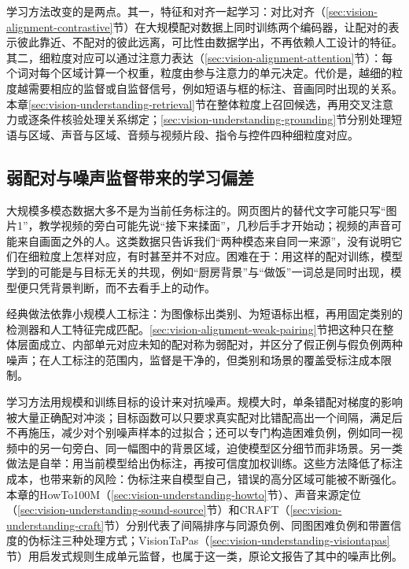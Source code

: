 学习方法改变的是两点。其一，特征和对齐一起学习：对比对齐（\ref{sec:vision-alignment-contrastive}节）在大规模配对数据上同时训练两个编码器，让配对的表示彼此靠近、不配对的彼此远离，可比性由数据学出，不再依赖人工设计的特征。其二，细粒度对应可以通过注意力表达（\ref{sec:vision-alignment-attention}节）：每个词对每个区域计算一个权重，粒度由参与注意力的单元决定。代价是，越细的粒度越需要相应的监督或自监督信号，例如短语与框的标注、音画同时出现的关系。本章\ref{sec:vision-understanding-retrieval}节在整体粒度上召回候选，再用交叉注意力或逐条件核验处理关系绑定；\ref{sec:vision-understanding-grounding}节分别处理短语与区域、声音与区域、音频与视频片段、指令与控件四种细粒度对应。

\subsection{弱配对与噪声监督带来的学习偏差}
\label{sec:vision-understanding-challenge-weak-pairing}

大规模多模态数据大多不是为当前任务标注的。网页图片的替代文字可能只写“图片1”，教学视频的旁白可能先说“接下来揉面”，几秒后手才开始动；视频的声音可能来自画面之外的人。这类数据只告诉我们“两种模态来自同一来源”，没有说明它们在细粒度上怎样对应，有时甚至并不对应。困难在于：用这样的配对训练，模型学到的可能是与目标无关的共现，例如“厨房背景”与“做饭”一词总是同时出现，模型便只凭背景判断，而不去看手上的动作。

经典做法依靠小规模人工标注：为图像标出类别、为短语标出框，再用固定类别的检测器和人工特征完成匹配。\ref{sec:vision-alignment-weak-pairing}节把这种只在整体层面成立、内部单元对应未知的配对称为弱配对，并区分了假正例与假负例两种噪声；在人工标注的范围内，监督是干净的，但类别和场景的覆盖受标注成本限制。

学习方法用规模和训练目标的设计来对抗噪声。规模大时，单条错配对梯度的影响被大量正确配对冲淡；目标函数可以只要求真实配对比错配高出一个间隔，满足后不再施压，减少对个别噪声样本的过拟合；还可以专门构造困难负例，例如同一视频中的另一句旁白、同一幅图中的背景区域，迫使模型区分细节而非场景。另一类做法是自举：用当前模型给出伪标注，再按可信度加权训练。这些方法降低了标注成本，也带来新的风险：伪标注来自模型自己，错误的高分区域可能被不断强化。本章的HowTo100M（\ref{sec:vision-understanding-howto}节）、声音来源定位（\ref{sec:vision-understanding-sound-source}节）和CRAFT（\ref{sec:vision-understanding-craft}节）分别代表了间隔排序与同源负例、同图困难负例和带置信度的伪标注三种处理方式；VisionTaPas（\ref{sec:vision-understanding-visiontapas}节）用启发式规则生成单元监督，也属于这一类，原论文报告了其中的噪声比例。

